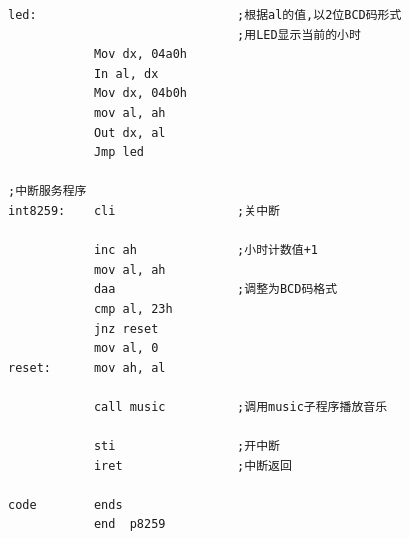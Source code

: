 \documentclass[11pt]{article}
\begin{document}
\begin{center}
\begin{lstlisting}[caption = {代码清单}, label = {lst: code}]
led:                            ;根据al的值,以2位BCD码形式
                                ;用LED显示当前的小时
            Mov dx, 04a0h
            In al, dx
            Mov dx, 04b0h
            mov al, ah
            Out dx, al
            Jmp led

;中断服务程序
int8259:    cli                 ;关中断

            inc ah              ;小时计数值+1
            mov al, ah
            daa                 ;调整为BCD码格式
            cmp al, 23h
            jnz reset
            mov al, 0
reset:      mov ah, al

            call music          ;调用music子程序播放音乐

            sti                 ;开中断
            iret                ;中断返回

code        ends
            end  p8259
\end{lstlisting}
\end{center}

\end{document}
